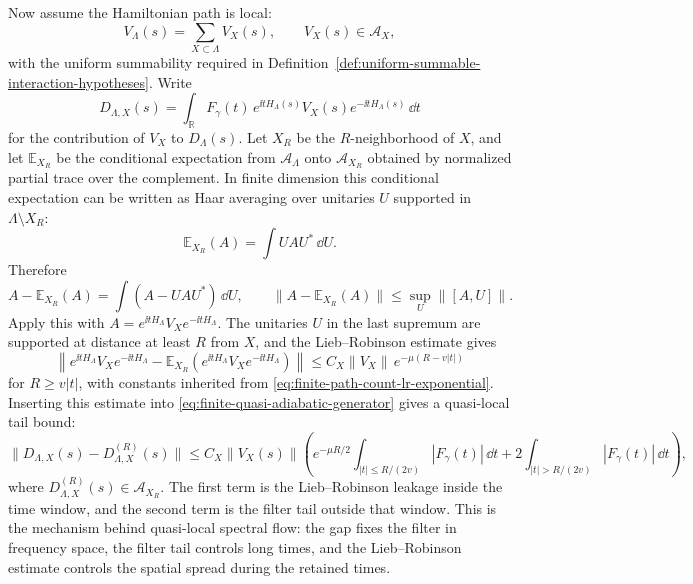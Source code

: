 Now assume the Hamiltonian path is local:
\[
  V_\Lambda(s)=\sum_{X\subset\Lambda}V_X(s),
  \qquad V_X(s)\in\mathcal A_X,
\]
with the uniform summability required in
Definition~\ref{def:uniform-summable-interaction-hypotheses}.  Write
\[
  D_{\Lambda,X}(s)
  =
  \int_{\mathbb R}F_\gamma(t)\,
  e^{\ii tH_\Lambda(s)}V_X(s)e^{-\ii tH_\Lambda(s)}\,\dd t
\]
for the contribution of \(V_X\) to \(D_\Lambda(s)\).  Let \(X_R\) be the
\(R\)-neighborhood of \(X\), and let \(\mathbb E_{X_R}\) be the conditional
expectation from
\(\mathcal A_\Lambda\) onto \(\mathcal A_{X_R}\) obtained by normalized
partial trace over the complement.  In finite dimension this conditional
expectation can be written as Haar averaging over unitaries \(U\) supported in
\(\Lambda\setminus X_R\):
\[
  \mathbb E_{X_R}(A)=\int UAU^*\,\dd U .
\]
Therefore
\[
  A-\mathbb E_{X_R}(A)=\int (A-UAU^*)\,\dd U,
  \qquad
  \|A-\mathbb E_{X_R}(A)\|
  \le
  \sup_U\|[A,U]\|.
\]
Apply this with \(A=e^{\ii tH_\Lambda}V_Xe^{-\ii tH_\Lambda}\).  The
unitaries \(U\) in the last supremum are supported at distance at least \(R\)
from \(X\), and the Lieb--Robinson estimate gives
\[
  \left\|
    e^{\ii tH_\Lambda}V_Xe^{-\ii tH_\Lambda}
    -
    \mathbb E_{X_R}\!\left(e^{\ii tH_\Lambda}V_Xe^{-\ii tH_\Lambda}\right)
  \right\|
  \le
  C_X\|V_X\|\,e^{-\mu(R-v|t|)}
\]
for \(R\ge v|t|\), with constants inherited from
\eqref{eq:finite-path-count-lr-exponential}.  Inserting this estimate into
\eqref{eq:finite-quasi-adiabatic-generator} gives a quasi-local tail bound:
\[
  \|D_{\Lambda,X}(s)-D_{\Lambda,X}^{(R)}(s)\|
  \le
  C_X\|V_X(s)\|
  \left(
    e^{-\mu R/2}\int_{|t|\le R/(2v)}|F_\gamma(t)|\,\dd t
    +
    2\int_{|t|>R/(2v)}|F_\gamma(t)|\,\dd t
  \right),
\]
where \(D_{\Lambda,X}^{(R)}(s)\in\mathcal A_{X_R}\).  The first term is the
Lieb--Robinson leakage inside the time window, and the second term is the
filter tail outside that window.  This is the mechanism behind quasi-local
spectral flow: the gap fixes the filter in frequency space, the filter tail
controls long times, and the Lieb--Robinson estimate controls the spatial
spread during the retained times.

